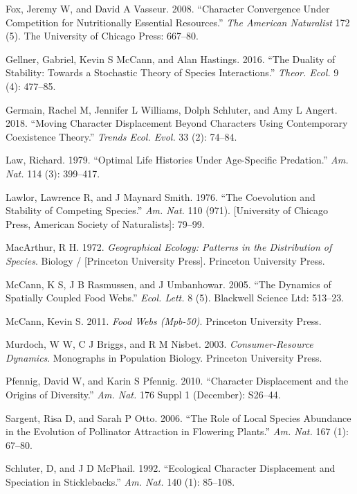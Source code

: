 \documentclass[11pt,]{article}
\begin{document}
\hypertarget{ref-Fox2008}{}
Fox, Jeremy W, and David A Vasseur. 2008. ``Character Convergence Under
Competition for Nutritionally Essential Resources.'' \emph{The American
Naturalist} 172 (5). The University of Chicago Press: 667--80.

\hypertarget{ref-Gellner2016}{}
Gellner, Gabriel, Kevin S McCann, and Alan Hastings. 2016. ``The Duality
of Stability: Towards a Stochastic Theory of Species Interactions.''
\emph{Theor. Ecol.} 9 (4): 477--85.

\hypertarget{ref-Germain2018}{}
Germain, Rachel M, Jennifer L Williams, Dolph Schluter, and Amy L
Angert. 2018. ``Moving Character Displacement Beyond Characters Using
Contemporary Coexistence Theory.'' \emph{Trends Ecol. Evol.} 33 (2):
74--84.

\hypertarget{ref-Law1979}{}
Law, Richard. 1979. ``Optimal Life Histories Under Age-Specific
Predation.'' \emph{Am. Nat.} 114 (3): 399--417.

\hypertarget{ref-Lawlor1976}{}
Lawlor, Lawrence R, and J Maynard Smith. 1976. ``The Coevolution and
Stability of Competing Species.'' \emph{Am. Nat.} 110 (971).
{[}University of Chicago Press, American Society of Naturalists{]}:
79--99.

\hypertarget{ref-MacArthur1972}{}
MacArthur, R H. 1972. \emph{Geographical Ecology: Patterns in the
Distribution of Species}. Biology / {[}Princeton University Press{]}.
Princeton University Press.

\hypertarget{ref-McCann2005}{}
McCann, K S, J B Rasmussen, and J Umbanhowar. 2005. ``The Dynamics of
Spatially Coupled Food Webs.'' \emph{Ecol. Lett.} 8 (5). Blackwell
Science Ltd: 513--23.

\hypertarget{ref-McCann2011}{}
McCann, Kevin S. 2011. \emph{Food Webs (Mpb-50)}. Princeton University
Press.

\hypertarget{ref-Murdoch2003}{}
Murdoch, W W, C J Briggs, and R M Nisbet. 2003. \emph{Consumer-Resource
Dynamics}. Monographs in Population Biology. Princeton University Press.

\hypertarget{ref-Pfennig2010}{}
Pfennig, David W, and Karin S Pfennig. 2010. ``Character Displacement
and the Origins of Diversity.'' \emph{Am. Nat.} 176 Suppl 1 (December):
S26--44.

\hypertarget{ref-Sargent2006}{}
Sargent, Risa D, and Sarah P Otto. 2006. ``The Role of Local Species
Abundance in the Evolution of Pollinator Attraction in Flowering
Plants.'' \emph{Am. Nat.} 167 (1): 67--80.

\hypertarget{ref-Schluter1992}{}
Schluter, D, and J D McPhail. 1992. ``Ecological Character Displacement
and Speciation in Sticklebacks.'' \emph{Am. Nat.} 140 (1): 85--108.
\end{document}

